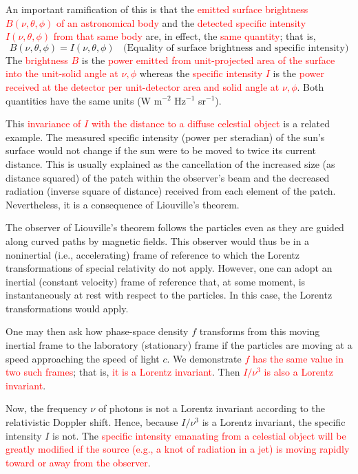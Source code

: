 \documentclass[12pt,a4paper]{article}
\newcounter{theo}[section]\setcounter{theo}{0}
\begin{document}
An important ramification of this is that the \textcolor{red}{emitted surface brightness $B(\nu, \theta, \phi)$ of an astronomical body} and the \textcolor{red}{detected specific intensity $I(\nu, \theta, \phi)$ from that same body} are, in effect, the \textcolor{red}{same quantity}; that is,
\begin{equation}
B(\nu, \theta, \phi) = I(\nu, \theta, \phi)  ~~~~ \text{(Equality of surface brightness and specific intensity)}
\end{equation}
The \textcolor{red}{brightness $B$} is the \textcolor{red}{power emitted from unit-projected area of the surface into the unit-solid angle at $\nu, \phi$} whereas the \textcolor{red}{specific intensity $I$} is the \textcolor{red}{power received at the detector per unit-detector area and solid angle at $\nu, \phi$}. Both quantities have the same units (W m$^{-2}$ Hz$^{-1}$ sr$^{-1}$).

This \textcolor{red}{invariance of $I$ with the distance to a diffuse celestial object} is a related example. The measured specific intensity (power per steradian) of the sun's surface would not change if the sun were to be moved to twice its current distance. This is usually explained as the cancellation of the increased size (as distance squared) of the patch within the observer's beam and the decreased radiation (inverse square of distance) received from each element of the patch. Nevertheless, it is a consequence of Liouville's theorem.

The observer of Liouville's theorem follows the particles even as they are guided along curved paths by magnetic fields. This observer would thus be in a noninertial (i.e., accelerating) frame of reference to which the Lorentz transformations of special relativity do not apply. However, one can adopt an inertial (constant velocity) frame of reference that, at some moment, is instantaneously at rest with respect to the particles. In this case, the Lorentz transformations would apply.

One may then ask how phase-space density $f$ transforms from this moving inertial frame to the laboratory (stationary) frame if the particles are moving at a speed approaching the speed of light $c$. We demonstrate \textcolor{red}{$f$ has the same value in two such frames}; that is, \textcolor{red}{it is a Lorentz invariant}. Then \textcolor{red}{$I/\nu^3$ is also a Lorentz invariant}.

Now, the frequency $\nu$ of photons is not a Lorentz invariant according to the relativistic Doppler shift. Hence, because $I/\nu^3$ is a Lorentz invariant, the specific intensity $I$ is not. The \textcolor{red}{specific intensity emanating from a celestial object will be greatly modified if the source (e.g., a knot of radiation in a jet) is moving rapidly toward or away from the observer}.
\end{document}
